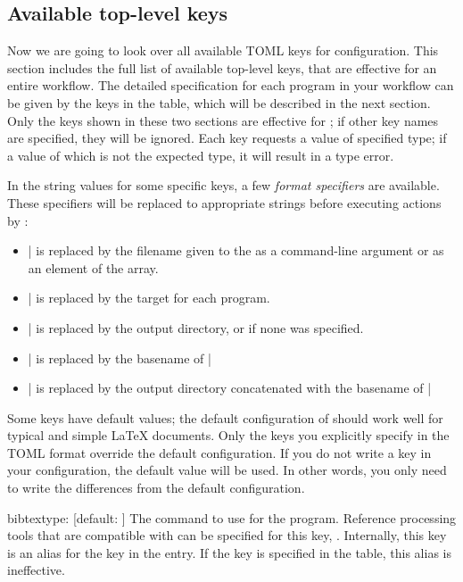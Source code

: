 \documentclass{llmk-doc}
\begin{document}
\subsection{Available top-level keys}
\label{sec:top-level-keys}

Now we are going to look over all available TOML keys for 
configuration. This section includes the full list of available top-level keys,
that are effective for an entire workflow. The detailed specification for each
program in your workflow can be given by the keys in the  table,
which will be described in the next section. Only the keys shown in these two
sections are effective for ; if other key names are specified, they
will be ignored. Each key requests a value of specified type; if a value of
which is not the expected type, it will result in a type error.

In the string values for some specific keys, a few \emph{format specifiers} are
available. These specifiers will be replaced to appropriate strings before
executing actions by :
%
\begin{itemize}
\item |%
  is replaced by the filename given to the  as a command-line
  argument or as an element of the  array.
\item |%
  is replaced by the target for each program.
\item |%
  is replaced by the output directory, or  if none was specified.
\item |%
  is replaced by the basename of |%
\item |%
  is replaced by the output directory concatenated with the basename of |%
\end{itemize}

Some keys have default values; the default configuration of  should
work well for typical and simple {\LaTeX} documents. Only the keys you
explicitly specify in the TOML format override the default configuration. If
you do not write a key in your configuration, the default value will be used.
In other words, you only need to write the differences from the default
configuration.

\begin{confkey}{bibtex}{type: }[default: ]
The command to use for the  program. Reference processing
tools that are compatible with {\BibTeX} can be specified for this key, \eg
{}. Internally, this key is an alias for the  key in
the  entry. If the  key is specified in the
 table, this alias is ineffective.
\end{confkey}
\end{document}
